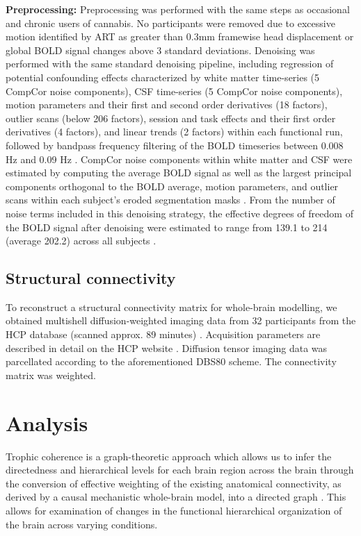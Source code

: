 \textbf{Preprocessing:} Preprocessing was performed with the same steps
as occasional and chronic users of cannabis. No participants were removed due to excessive motion identified by ART as greater than 0.3mm framewise head displacement or global BOLD signal changes above 3 standard deviations. Denoising was performed
with the same standard denoising pipeline, including regression of
potential confounding effects characterized by white matter time-series
(5 CompCor noise components), CSF time-series (5 CompCor noise
components), motion parameters and their first and second order
derivatives (18 factors), outlier scans (below 206 factors), session and
task effects and their first order derivatives (4 factors), and linear
trends (2 factors) within each functional run, followed by bandpass
frequency filtering of the BOLD timeseries between 0.008 Hz and 0.09 Hz \parencite{Friston1996,Hallquist2013,Nieto-Castanon2020,Power2014}. CompCor noise components within white matter
and CSF were estimated by computing the average BOLD signal as well as
the largest principal components orthogonal to the BOLD average, motion
parameters, and outlier scans within each subject's eroded segmentation
masks \parencite{Behzadi2007,Chai2012}. From the number of
noise terms included in this denoising strategy, the effective degrees
of freedom of the BOLD signal after denoising were estimated to range
from 139.1 to 214 (average 202.2) across all subjects \parencite{Nieto-Castanon2022a}.
\subsection{Structural connectivity} 
To reconstruct
a structural connectivity matrix for whole-brain modelling, we obtained
multishell diffusion-weighted imaging data from 32 participants from the
HCP database (scanned approx. 89 minutes) \parencite{Kringelbach2023}.
Acquisition parameters are described in detail on the HCP website \parencite{Setsompop2013}. Diffusion tensor imaging data was parcellated
according to the aforementioned DBS80 scheme. The connectivity matrix
was weighted.
\section{Analysis}
Trophic coherence is
a graph-theoretic approach which allows us to infer the directedness and
hierarchical levels for each brain region across the brain through the
conversion of effective weighting of the existing anatomical
connectivity, as derived by a causal mechanistic whole-brain model, into a
directed graph \parencite{MacKay2020, Johnson2014}. This allows for examination of changes in the functional
hierarchical organization of the brain across varying conditions. 
